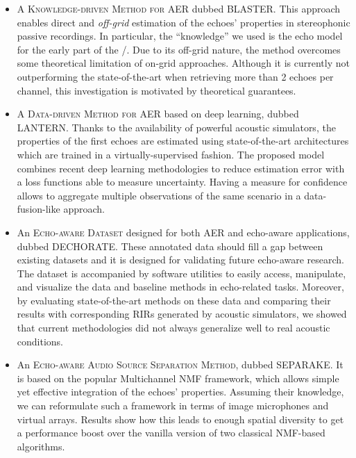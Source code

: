 \begin{itemize}

    \item A \textsc{Knowledge-driven Method for AER} dubbed \acs{BLASTER}.
    This approach enables direct and \textit{off-grid} estimation of the echoes' properties in stereophonic passive recordings.
    In particular, the ``knowledge'' we used is the echo model for the early part of the \RIRs/.
    Due to its off-grid nature, the method overcomes some theoretical limitation of on-grid approaches.
    Although it is currently not outperforming the state-of-the-art when retrieving more than 2 echoes per channel, this investigation is motivated by theoretical guarantees.

    \item A \textsc{Data-driven Method for AER} based on deep learning, dubbed \acs{LANTERN}.
    Thanks to the availability of powerful acoustic simulators, the properties of the first echoes are estimated using state-of-the-art architectures which are trained in a virtually-supervised fashion.
    The proposed model combines recent deep learning methodologies to reduce estimation error with a loss functions able to measure uncertainty.
    Having a measure for confidence allows to aggregate multiple observations of the same scenario in a data-fusion-like approach.

    \item An \textsc{Echo-aware Dataset} designed for both AER and echo-aware applications, dubbed \acs{DECHORATE}.
    These annotated data should fill a gap between existing datasets and it is designed for validating future echo-aware research.
    The dataset is accompanied by software utilities to easily access, manipulate, and visualize the data and baseline methods in echo-related tasks.
    Moreover, by evaluating state-of-the-art methods on these data and comparing their results with corresponding \acp{RIR} generated by acoustic simulators,
    we showed that current methodologies did not always generalize well to real acoustic conditions.

    \item An \textsc{Echo-aware Audio Source Separation Method}, dubbed \acs{SEPARAKE}.
    It is based on the popular Multichannel NMF framework, which allows simple yet effective integration of the echoes' properties.
    Assuming their knowledge, we can reformulate such a framework in terms of image microphones and virtual arrays.
    Results show how this leads to enough spatial diversity to get a performance boost over the vanilla version of two classical NMF-based algorithms.


\end{itemize}

